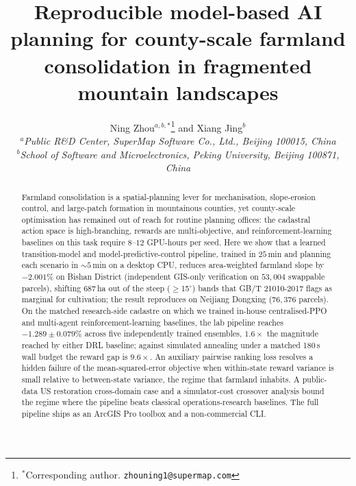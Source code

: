 \documentclass[11pt]{article}
\begin{document}
\title{Reproducible model-based AI planning for county-scale farmland consolidation in fragmented mountain landscapes}

\author{Ning Zhou$^{a,b,\ast}$\thanks{$^\ast$Corresponding author. \texttt{zhouning1@supermap.com}} and Xiang Jing$^{b}$\\
$^{a}${\em Public R\&D Center, SuperMap Software Co., Ltd., Beijing 100015, China}\\
$^{b}${\em School of Software and Microelectronics, Peking University, Beijing 100871, China}}

\date{}
\maketitle
\sloppy  %

\begin{abstract}
Farmland consolidation is a spatial-planning lever for mechanisation, slope-erosion control, and large-patch formation in mountainous counties, yet county-scale optimisation has remained out of reach for routine planning offices: the cadastral action space is high-branching, rewards are multi-objective, and reinforcement-learning baselines on this task require $8$--$12$ GPU-hours per seed. Here we show that a learned transition-model and model-predictive-control pipeline, trained in $25$\,min and planning each scenario in ${\sim}5$\,min on a desktop CPU, reduces area-weighted farmland slope by $-2.001\%$ on Bishan District (independent GIS-only verification on $53{,}004$ swappable parcels), shifting $687$\,ha out of the steep ($\geq$15$^\circ$) bands that GB/T 21010-2017 flags as marginal for cultivation; the result reproduces on Neijiang Dongxing ($76{,}376$ parcels). On the matched research-side cadastre on which we trained in-house centralised-PPO and multi-agent reinforcement-learning baselines, the lab pipeline reaches $-1.289 \pm 0.079\%$ across five independently trained ensembles, $1.6\times$ the magnitude reached by either DRL baseline; against simulated annealing under a matched 180\,s wall budget the reward gap is $9.6\times$. An auxiliary pairwise ranking loss resolves a hidden failure of the mean-squared-error objective when within-state reward variance is small relative to between-state variance, the regime that farmland inhabits. A public-data US restoration cross-domain case and a simulator-cost crossover analysis bound the regime where the pipeline beats classical operations-research baselines. The full pipeline ships as an ArcGIS Pro toolbox and a non-commercial CLI.
\end{abstract}
\end{document}
